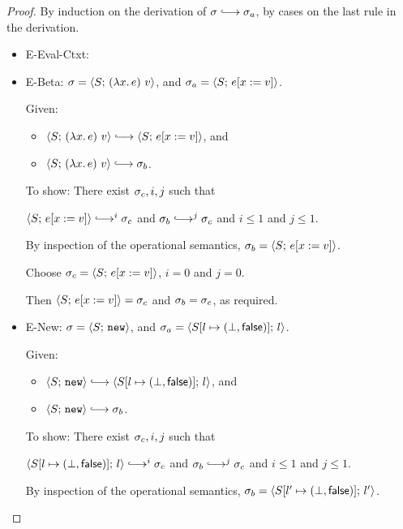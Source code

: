 \begin{proof}
  By induction on the derivation of $\conf \parstepsto \conf_a$, by
  cases on the last rule in the derivation.

  \begin{itemize}
    \item {\sc E-Eval-Ctxt}: 

    \item {\sc E-Beta}: $\sigma = \langle S;\, (\lambda x.\,e)~v \rangle$,
      and $\sigma_a = \langle S;\, e[x := v] \rangle$.

      Given:
      \begin{itemize}
      \item $\config{S}{\app{(\lam{x}{e})}{v}} \parstepsto
        \config{S}{\subst{e}{x}{v}}$, and
      \item $\config{S}{\app{(\lam{x}{e})}{v}} \parstepsto \conf_b$.
      \end{itemize}

      To show: There exist $\sigma_c, i, j$ such that

      $\config{S}{\subst{e}{x}{v}} \parstepsto^i \conf_c$ and $\conf_b
      \parstepsto^j \conf_c$ and $i \leq 1$ and $j \leq 1$.

      By inspection of the operational semantics, $\sigma_b =
      \langle S;\, e[x := v] \rangle$.

      Choose $\sigma_c = \langle S;\, e[x := v] \rangle$, $i = 0$ and $j =
      0$.

      Then $\langle S;\, e[x := v] \rangle = \sigma_c$ and $\sigma_b =
      \sigma_c$, as required.

    \item {\sc E-New}: $\sigma = \langle S;\, \mbox{\texttt{new}} \rangle$, and $\sigma_a =
      \langle S[l \mapsto (\bot, \textsf{false})];\, l \rangle$.

      Given:
      \begin{itemize}
      \item $\config{S}{\NEW} \parstepsto
        \config{\extS{S}{l}{\bot}{\frozenfalse}}{l}$, and
      \item $\config{S}{\NEW} \parstepsto \conf_b$.
      \end{itemize}

      To show: There exist $\sigma_c, i, j$ such that

      $\config{\extS{S}{l}{\bot}{\frozenfalse}}{l} \parstepsto^i
      \conf_c$ and $\conf_b \parstepsto^j \conf_c$ and $i \leq 1$ and
      $j \leq 1$.

      By inspection of the operational semantics, $\sigma_b =
      \langle S[l' \mapsto (\bot, \textsf{false})];\, l' \rangle$.


\end{itemize}
\end{proof}
